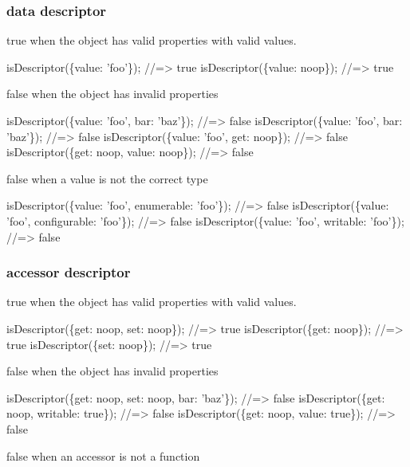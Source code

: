 \subsubsection*{data descriptor}

{\ttfamily true} when the object has valid properties with valid values.


\begin{DoxyCode}
isDescriptor(\{value: 'foo'\});
//=> true
isDescriptor(\{value: noop\});
//=> true
\end{DoxyCode}


{\ttfamily false} when the object has invalid properties


\begin{DoxyCode}
isDescriptor(\{value: 'foo', bar: 'baz'\});
//=> false
isDescriptor(\{value: 'foo', bar: 'baz'\});
//=> false
isDescriptor(\{value: 'foo', get: noop\});
//=> false
isDescriptor(\{get: noop, value: noop\});
//=> false
\end{DoxyCode}


{\ttfamily false} when a value is not the correct type


\begin{DoxyCode}
isDescriptor(\{value: 'foo', enumerable: 'foo'\});
//=> false
isDescriptor(\{value: 'foo', configurable: 'foo'\});
//=> false
isDescriptor(\{value: 'foo', writable: 'foo'\});
//=> false
\end{DoxyCode}


\subsubsection*{accessor descriptor}

{\ttfamily true} when the object has valid properties with valid values.


\begin{DoxyCode}
isDescriptor(\{get: noop, set: noop\});
//=> true
isDescriptor(\{get: noop\});
//=> true
isDescriptor(\{set: noop\});
//=> true
\end{DoxyCode}


{\ttfamily false} when the object has invalid properties


\begin{DoxyCode}
isDescriptor(\{get: noop, set: noop, bar: 'baz'\});
//=> false
isDescriptor(\{get: noop, writable: true\});
//=> false
isDescriptor(\{get: noop, value: true\});
//=> false
\end{DoxyCode}


{\ttfamily false} when an accessor is not a function



